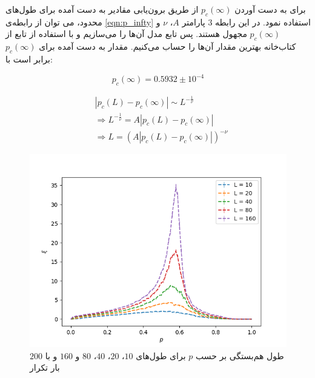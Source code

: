 \documentclass[11pt, a4paper]{article}
\begin{document}
برای به دست آوردن
$p_c(\infty)$
از طریق برون‌یابی مقادیر به دست آمده برای طول‌های محدود،
می توان از رابطه‌ی
\eqref{eqn:p_infty}
استفاده نمود.
در این رابطه
$3$
پارامتر
$A$،
$\nu$
و
$p_c(\infty)$
مجهول هستند.
پس تابع مدل آن‌ها را می‌سازیم و با استفاده از تابع
از کتاب‌خانه
بهترین مقدار آن‌ها را حساب می‌کنیم.
مقدار به دست آمده برای 
$p_c(\infty)$
برابر است با:

\begin{equation}
  p_c(\infty) = 0.5932 \pm 10^{-4}
\end{equation}

\begin{align}
  & |p_c(L) - p_c(\infty)| \sim L^{-\frac{1}{\nu}} \nonumber \\
  & \Rightarrow
  L^{-\frac{1}{\nu}} = A|p_c(L) - p_c(\infty)| \nonumber \\
  & \Rightarrow
  L = (A |p_c(L) - p_c(\infty)|)^{-\nu}
  \label{eqn:p_infty}
\end{align}

\begin{figure}[h]
  \centering
  \includegraphics[width=.7\textwidth]{q5_0.0_0.01_1.0_100_(10, 20, 40, 80, 160).png}
  \caption{طول هم‌بستگی بر حسب $p$ برای طول‌های $10$، $20$، $40$، $80$ و $160$ و با $200$ بار تکرار}
  \label{fig:q5_(10, 20, 40, 80, 160)}
\end{figure}
\end{document}
